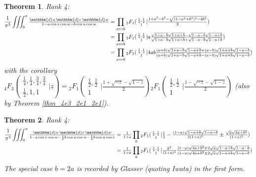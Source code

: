 \documentclass[12pt]{article}
\newcommand{\dd}[0] {\mathbbm{d}}
\numberwithin{equation}{section}
\newtheorem{theorem}{Theorem}[section]
\newcommand{\Head}[3] {{}_{#1}{#2}_{#3}}
\newcommand{\ArgS}[3] {( \begin{smallmatrix} #1 \\ #2 \end{smallmatrix} | {#3})}
\newcommand{\ArgKS}[1] {\ArgS{\frac12,\frac12}{1}{#1}}
\newcommand{\FFs}[6] {{}_{#1}{#2}_{#3} ( \begin{smallmatrix} #4 \\ #5 \end{smallmatrix} | {#6}  )}
\begin{document}
\begin{theorem} Rank 4:
\begin{align*}
\frac{1}{\pi^3} \iiint_0^{\pi} \tfrac{\dd u \, \dd v \, \dd w} {1 - a \cos v \cos w - b \cos u \cos w} &= \prod_{a \leftrightarrow b} \Head{2}{F}{1} \ArgKS{\tfrac{1 + a^2 - b^2-\sqrt{(1-a^2+b^2)^2-4b^2}}{2}}\\
&= \prod_{a \leftrightarrow b} \Head{2}{F}{1} \ArgKS{a\tfrac{\sqrt{1+a-b}\sqrt{1+a+b}-\sqrt{1-a-b}\sqrt{1-a+b}}{\sqrt{1+a-b}\sqrt{1+a+b}+\sqrt{1-a-b}\sqrt{1-a+b}}}\\
&= \prod_{a \leftrightarrow b} \Head{2}{F}{1}\ArgS{\frac14,\frac14}{1}{4a b \tfrac{(a+b)\sqrt{1+a-b}\sqrt{1-a+b} + (a-b) \sqrt{1+a+b}\sqrt{1-a-b}}{(a+b)\sqrt{1+a-b}\sqrt{1-a+b} - (a-b) \sqrt{1+a+b}\sqrt{1-a-b}}}
\end{align*}
with the corollary
$\FFs{4}{F}{3}{\frac14,\frac14,\frac34,\frac34}{\frac12,1,1}{z} = \Head{2}{F}{1}\ArgKS{\tfrac{1+\sqrt{-z} -\sqrt{1-z}}{2}} \Head{2}{F}{1}\ArgKS{\tfrac{1-\sqrt{-z} -\sqrt{1-z}}{2}}$ (also by Theorem \ref{thm_4e3_2e1_2e1}).
\end{theorem}

\begin{theorem} Rank 4:
\begin{align*}
\frac{1}{\pi^3} \iiint_0^{\pi} \tfrac{\dd u \, \dd v \, \dd w} {1 - a \cos v \cos w - \frac12 b \cos u \cos w - \frac12 b \cos u \cos v} &= \tfrac{1}{1+a} \prod_{\pm} \Head{2}{F}{1} \ArgKS{\tfrac{1}{2}-\tfrac{(1-a)\sqrt{1-a+b}\sqrt{1-a-b}}{2(1+a)^2} \pm \tfrac{\sqrt{a}\sqrt{4a+ b^2}}{(1+a)^2}}\\
&= \tfrac{1}{1+a} \prod_{\pm} \Head{2}{F}{1} \ArgS{\frac14,\frac14}{1}{ \tfrac{b^2}{(1+a)^2} \tfrac{(1-a)\sqrt{4a+b^2} \mp 2 \sqrt{a}\sqrt{1-a+b}\sqrt{1-a-b}}{(1-a)\sqrt{4a+b^2} \pm 2 \sqrt{a}\sqrt{1-a+b}\sqrt{1-a-b}} }
\end{align*}
The special case $b = 2a$ is recorded by Glasser (quoting Iwata) in the first form.
\end{theorem}
\end{document}
